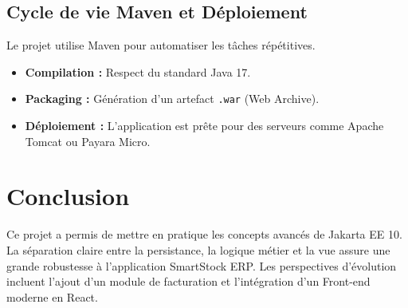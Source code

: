 \documentclass[12pt,a4paper]{report}
\begin{document}
\section{Cycle de vie Maven et Déploiement}
Le projet utilise Maven pour automatiser les tâches répétitives.
\begin{itemize}
    \item \textbf{Compilation :} Respect du standard Java 17.
    \item \textbf{Packaging :} Génération d'un artefact \texttt{.war} (Web Archive).
    \item \textbf{Déploiement :} L'application est prête pour des serveurs comme Apache Tomcat ou Payara Micro.
\end{itemize}

\chapter*{Conclusion}
Ce projet a permis de mettre en pratique les concepts avancés de Jakarta EE 10. La séparation claire entre la persistance, la logique métier et la vue assure une grande robustesse à l'application SmartStock ERP. Les perspectives d'évolution incluent l'ajout d'un module de facturation et l'intégration d'un Front-end moderne en React.
\end{document}
